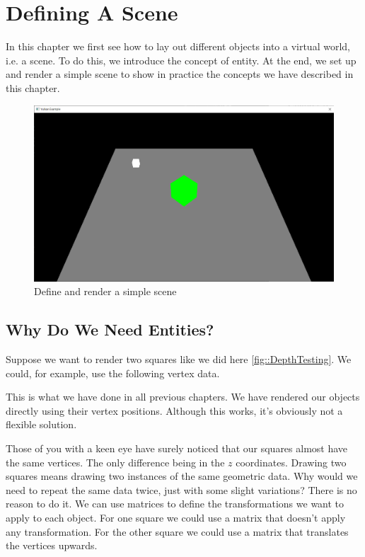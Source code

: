 \chapter{Defining A Scene}

In this chapter we first see how to lay out different objects into a virtual
world, i.e. a scene.
To do this, we introduce the concept of entity.
At the end, we set up and render a simple scene to show in practice the
concepts we have described in this chapter.

\begin{figure}[ht]
    \centering
    \includegraphics[scale=0.20]{images/ChScene/SimpleScene.png}
    \caption{Define and render a simple scene}
    \label{fig::SimpleScene}
\end{figure}

\section{Why Do We Need Entities?}

Suppose we want to render two squares like we did here \ref{fig::DepthTesting}.
We could, for example, use the following vertex data.

\begin{minipage}{\linewidth}{\noindent}
    
\end{minipage}

This is what we have done in all previous chapters.
We have rendered our objects directly using their vertex positions.
Although this works, it's obviously not a flexible solution.

Those of you with a keen eye have surely noticed
that our squares almost have the same vertices.
The only difference being in the $z$ coordinates.
Drawing two squares means drawing two instances of the same geometric data.
Why would we need to repeat the same data twice, just with some slight variations?
There is no reason to do it.
We can use matrices to define the transformations we want to apply to each object.
For one square we could use a matrix that doesn't apply any transformation.
For the other square we could use a matrix that translates the vertices upwards.

